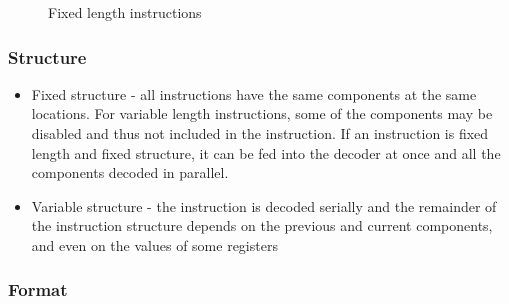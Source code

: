 \documentclass{report}
\begin{document}
\begin {figure}[H]
\centering
{}
\caption {Fixed length instructions}
\label {fig:instruction-format-components}
\end {figure}



\subsubsection{Structure}

\begin{itemize}
    \item{Fixed structure - all instructions have the same components at the
        same locations. For variable length instructions, some of the components
        may be disabled and thus not included in the instruction. If an
        instruction is fixed length and fixed structure, it can be fed into the
        decoder at once and all the components decoded in parallel.}
    \item{Variable structure - the instruction is decoded serially and the
        remainder of the instruction structure depends on the previous and
        current components, and even on the values of some registers}
\end{itemize}

\subsubsection{Format}
\end{document}
